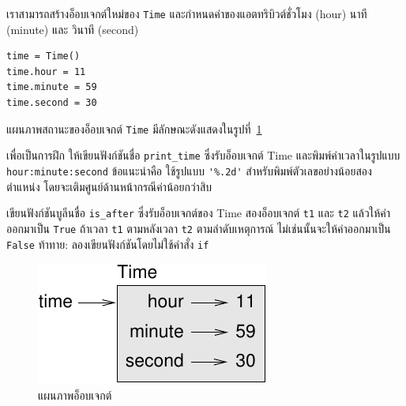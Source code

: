 เราสามารถสร้างอ็อบเจกต์ใหม่ของ {\tt Time} และกำหนดค่าของแอตทริบิวต์ชั่วโมง (hour) นาที (minute) และ วินาที (second)

\begin{verbatim}
time = Time()
time.hour = 11
time.minute = 59
time.second = 30
\end{verbatim}
%
แผนภาพสถานะของอ็อบเจกต์ {\tt Time} มีลักษณะดังแสดงในรูปที่~\ref{fig.time}


เพื่อเป็นการฝึก ให้เขียนฟังก์ชันชื่อ \verb|print_time| ซึ่งรับอ็อบเจกต์ Time 
และพิมพ์ค่าเวลาในรูปแบบ {\tt hour:minute:second}  
ข้อแนะนำคือ ใช้รูปแบบ \verb"'%.2d'" สำหรับพิมพ์ตัวเลขอย่างน้อยสองตำแหน่ง โดยจะเติมศูนย์ด้านหน้ากรณีค่าน้อยกว่าสิบ


เขียนฟังก์ชันบูลีนชื่อ \verb"is_after" ซึ่งรับอ็อบเจกต์ของ Time สองอ็อบเจกต์ {\tt t1} และ {\tt t2} 
แล้วให้ค่าออกมาเป็น {\tt True} ถ้าเวลา {\tt t1} ตามหลังเวลา {\tt t2} ตามลำดับเหตุการณ์ ไม่เช่นนั้นจะให้ค่าออกมาเป็น {\tt False}
ท้าทาย: ลองเขียนฟังก์ชันโดยไม่ใช้คำสั่ง {\tt if}

\begin{figure}
\centerline
{\includegraphics[scale=0.8]{figs/time.pdf}}
\caption{แผนภาพอ็อบเจกต์}
\label{fig.time}
\end{figure}


